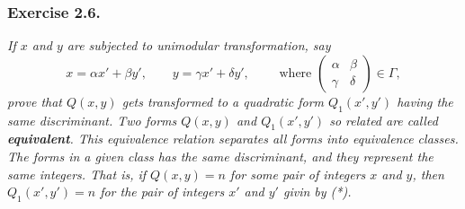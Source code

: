\documentclass{article}
\begin{document}
\subsubsection*{Exercise 2.6.}
\emph{If $x$ and $y$ are subjected to unimodular transformation, say
\[
  x = \alpha x' + \beta y',
  \qquad
  y = \gamma x' + \delta y',
  \qquad
  \text{ where }
  \begin{pmatrix}
    \alpha & \beta \\
    \gamma & \delta
  \end{pmatrix} \in \Gamma,
  \tag{*}
\]
prove that $Q(x,y)$ gets transformed to a quadratic form $Q_1(x',y')$ having the same discriminant.
Two forms $Q(x,y)$ and $Q_1(x',y')$ so related are called \textbf{equivalent}.
This equivalence relation separates all forms into equivalence classes.
The forms in a given class has the same discriminant, and they represent the same integers.
That is, if $Q(x,y) = n$ for some pair of integers $x$ and $y$,
then $Q_1(x',y') = n$ for the pair of integers $x'$ and $y'$ givin by (*).} \\
\end{document}
